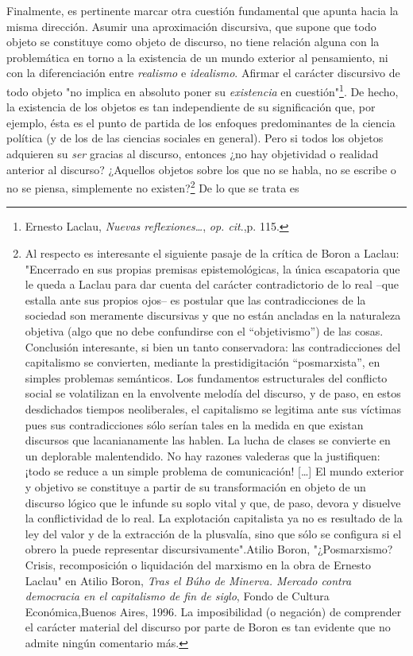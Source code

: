 \documentclass{book}
\begin{document}
Finalmente, es pertinente marcar otra cuestión fundamental que apunta
hacia la misma dirección. Asumir una aproximación discursiva, que supone
que todo objeto se constituye como objeto de discurso, no tiene relación
alguna con la problemática en torno a la existencia de un mundo exterior
al pensamiento, ni con la diferenciación entre \emph{realismo} e
\emph{idealismo}. Afirmar el carácter discursivo de todo objeto "no
implica en absoluto poner su \emph{existencia} en cuestión"\footnote{Ernesto
  Laclau, \emph{Nuevas reflexiones\ldots{}}, \emph{op. cit}.,p. 115.}.
De hecho, la existencia de los objetos es tan independiente de su
significación que, por ejemplo, ésta es el punto de partida de los
enfoques predominantes de la ciencia política (y de los de las ciencias
sociales en general). Pero si todos los objetos adquieren su \emph{ser}
gracias al discurso, entonces ¿no hay objetividad o realidad anterior al
discurso? ¿Aquellos objetos sobre los que no se habla, no se escribe o
no se piensa, simplemente no existen?\footnote{Al respecto es
  interesante el siguiente pasaje de la crítica de Boron a Laclau:
  "Encerrado en sus propias premisas epistemológicas, la única
  escapatoria que le queda a Laclau para dar cuenta del carácter
  contradictorio de lo real --que estalla ante sus propios ojos-- es
  postular que las contradicciones de la sociedad son meramente
  discursivas y que no están ancladas en la naturaleza objetiva (algo
  que no debe confundirse con el ``objetivismo'') de las cosas.
  Conclusión interesante, si bien un tanto conservadora: las
  contradicciones del capitalismo se convierten, mediante la
  prestidigitación ``posmarxista'', en simples problemas semánticos. Los
  fundamentos estructurales del conflicto social se volatilizan en la
  envolvente melodía del discurso, y de paso, en estos desdichados
  tiempos neoliberales, el capitalismo se legitima ante sus víctimas
  pues sus contradicciones sólo serían tales en la medida en que existan
  discursos que lacanianamente las hablen. La lucha de clases se
  convierte en un deplorable malentendido. No hay razones valederas que
  la justifiquen: ¡todo se reduce a un simple problema de comunicación!
  {[}\ldots{]} El mundo exterior y objetivo se constituye a partir de su
  transformación en objeto de un discurso lógico que le infunde su soplo
  vital y que, de paso, devora y disuelve la conflictividad de lo real.
  La explotación capitalista ya no es resultado de la ley del valor y de
  la extracción de la plusvalía, sino que sólo se configura si el obrero
  la puede representar discursivamente".Atilio Boron, "¿Posmarxismo?
  Crisis, recomposición o liquidación del marxismo en la obra de Ernesto
  Laclau" en Atilio Boron, \emph{Tras el Búho de Minerva. Mercado contra
  democracia en el capitalismo de fin de siglo}, Fondo de Cultura
  Económica,Buenos Aires, 1996. La imposibilidad (o negación) de
  comprender el carácter material del discurso por parte de Boron es tan
  evidente que no admite ningún comentario más.} De lo que se trata es
\end{document}
